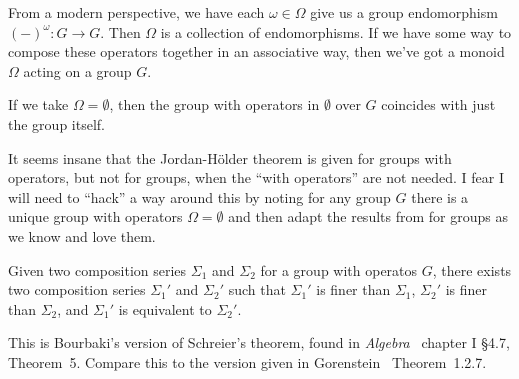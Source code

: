 \begin{def-remark}
From a modern perspective, we have each $\omega\in\Omega$ give us a
group endomorphism $(-)^{\omega}\colon G\to G$. Then $\Omega$ is a
collection of endomorphisms. If we have some way to compose these
operators together in an associative way, then we've got a monoid
$\Omega$ acting on a group $G$.
\end{def-remark}

\begin{def-remark}
If we take $\Omega=\emptyset$, then the group with operators in
$\emptyset$ over $G$ coincides with just the group itself.
\end{def-remark}

\begin{def-remark}
It seems insane that the Jordan-H\"older theorem is given for groups
with operators, but not for groups, when the ``with operators'' are not
needed. I fear I will need to ``hack'' a way around this by noting for
any group $G$ there is a unique group with operators $\Omega=\emptyset$
and then adapt the results from  for groups as we know and
love them.
\end{def-remark}

\begin{theorem}
Given two composition series $\Sigma_{1}$ and $\Sigma_{2}$ for a group
with operatos $G$, there exists two composition series $\Sigma_{1}'$ and $\Sigma_{2}'$
such that $\Sigma_{1}'$ is finer than $\Sigma_{1}$, $\Sigma_{2}'$ is
finer than $\Sigma_{2}$, and $\Sigma_{1}'$ is equivalent to $\Sigma_{2}'$.
\end{theorem}

\begin{thm-remark}
This is Bourbaki's version of Schreier's theorem, found in \emph{Algebra}~\cite{bourbaki1974elements}
chapter I \S4{.}7, Theorem~5. Compare this to the version given in
Gorenstein~\cite{gorenstein1980finite} Theorem~1{.}2{.}7.
\end{thm-remark}
